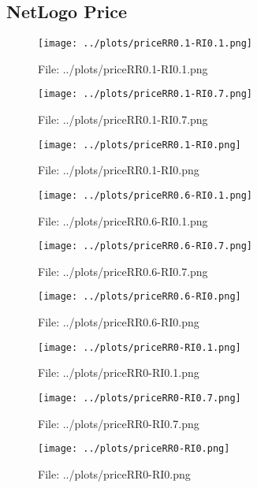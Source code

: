 \documentclass[a4paper, 11pt]{report}
\let\Oldsubsection\subsection
\renewcommand{\subsection}{\FloatBarrier\Oldsubsection}
\begin{document}
\subsection{NetLogo Price}
\begin{figure}[h!] \caption{File: ../plots/priceRR0.1-RI0.1.png} \texttt{[image: ../plots/priceRR0.1-RI0.1.png]} \end{figure}
\begin{figure}[h!] \caption{File: ../plots/priceRR0.1-RI0.7.png} \texttt{[image: ../plots/priceRR0.1-RI0.7.png]} \end{figure}
\begin{figure}[h!] \caption{File: ../plots/priceRR0.1-RI0.png} \texttt{[image: ../plots/priceRR0.1-RI0.png]} \end{figure}
\begin{figure}[h!] \caption{File: ../plots/priceRR0.6-RI0.1.png} \texttt{[image: ../plots/priceRR0.6-RI0.1.png]} \end{figure}
\begin{figure}[h!] \caption{File: ../plots/priceRR0.6-RI0.7.png} \texttt{[image: ../plots/priceRR0.6-RI0.7.png]} \end{figure}
\begin{figure}[h!] \caption{File: ../plots/priceRR0.6-RI0.png} \texttt{[image: ../plots/priceRR0.6-RI0.png]} \end{figure}
\begin{figure}[h!] \caption{File: ../plots/priceRR0-RI0.1.png} \texttt{[image: ../plots/priceRR0-RI0.1.png]} \end{figure}
\begin{figure}[h!] \caption{File: ../plots/priceRR0-RI0.7.png} \texttt{[image: ../plots/priceRR0-RI0.7.png]} \end{figure}
\begin{figure}[h!] \caption{File: ../plots/priceRR0-RI0.png} \texttt{[image: ../plots/priceRR0-RI0.png]} \end{figure}
\end{document}
